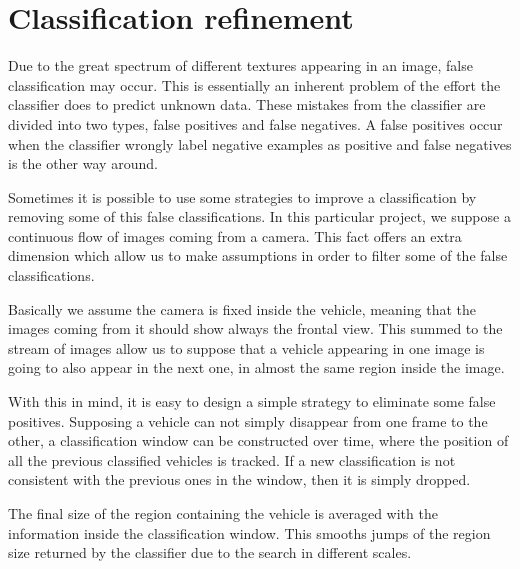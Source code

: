 


\section{Classification refinement} %
\label{sec:Classification-refinement}

Due to the great spectrum of different textures appearing in an image, false
classification may occur. This is essentially an inherent problem of the
effort the classifier does to predict unknown data. These mistakes from the
classifier are divided into two types, false positives and false negatives. A
false positives occur when the classifier wrongly label negative examples as 
positive and false negatives is the other way around.

Sometimes it is possible to use some strategies to improve a classification by
removing some of this false classifications. In this particular project, we
suppose a continuous flow of images coming from a camera.
This fact offers an extra dimension which allow us to make assumptions in
order to filter some of the false classifications.

Basically we assume the camera is fixed inside the vehicle, meaning that the images
coming from it should show always the frontal view. This summed to the stream of
images allow us to suppose that a vehicle appearing in one image is going to also 
appear in the next one, in almost the same region inside the image.

With this in mind, it is easy to design a simple strategy to eliminate some
false positives. Supposing a vehicle can not simply disappear from one
frame to the other, a classification window can be constructed over time, where
the position of all the previous classified vehicles is tracked. If a new
classification is not consistent with the previous ones in the window, then it
is simply dropped. 

The final size of the region containing the vehicle is averaged with the
information inside the classification window. This smooths jumps of the region
size returned by the classifier due to the search in different scales.

